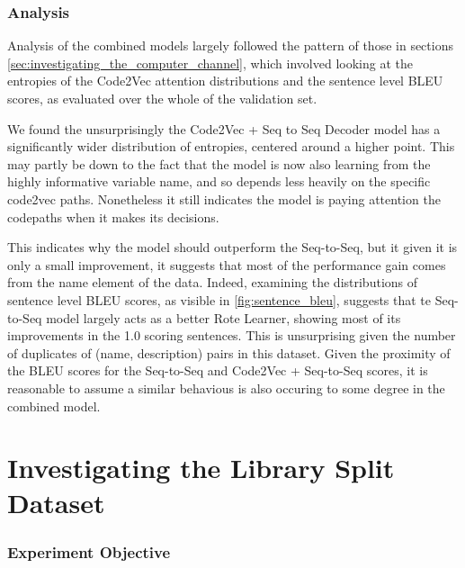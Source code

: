 \subsubsection{Analysis} %


Analysis of the combined models largely followed the pattern of those in sections \ref{sec:investigating_the_computer_channel}, which involved looking at the entropies of the Code2Vec attention distributions and the sentence level BLEU scores, as evaluated over the whole of the validation set.

We found the unsurprisingly the Code2Vec + Seq to Seq Decoder model has a significantly wider distribution of entropies, centered around a higher point. 
This may partly be down to the fact that the model is now also learning from the highly informative variable name, and so depends less heavily on the specific code2vec paths. Nonetheless it still indicates the model is paying attention the codepaths when it makes its decisions.

This indicates why the model should outperform the Seq-to-Seq, but it given it is only a small improvement, it suggests that most of the performance gain comes from the name element of the data. 
Indeed, examining the distributions of sentence level BLEU scores, as visible in  \ref{fig:sentence_bleu}, suggests that te Seq-to-Seq model largely acts as a better Rote Learner, showing most of its improvements in the 1.0 scoring sentences. 
This is unsurprising given the number of duplicates of (name, description) pairs in this dataset.
Given the proximity of the BLEU scores for the Seq-to-Seq and Code2Vec + Seq-to-Seq scores, it is reasonable to assume a similar behavious is also occuring to some degree in the combined model.



\section{Investigating the Library Split Dataset} %
\label{sec:analysis}

\subsubsection{Experiment Objective} %

